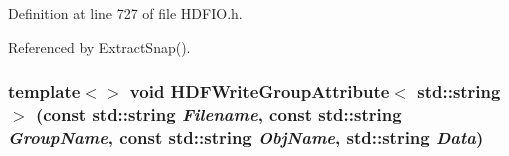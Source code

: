 Definition at line 727 of file HDFIO.h.



Referenced by ExtractSnap().

\subsubsection[{HDFWriteGroupAttribute$<$ std::string $>$}]{\setlength{\rightskip}{0pt plus 5cm}template$<$$>$ void HDFWriteGroupAttribute$<$ std::string $>$ (const std::string {\em Filename}, \/  const std::string {\em GroupName}, \/  const std::string {\em ObjName}, \/  std::string {\em Data})}\label{HDFIO_8h_a1e82999f4bd8497304ff6571d9566781}
